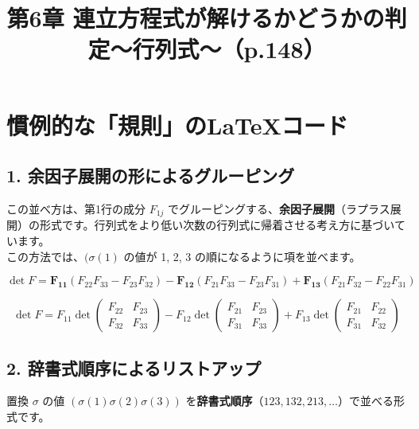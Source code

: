 \documentclass{ltjsarticle}
\begin{document}
\title{第6章 連立方程式が解けるかどうかの判定～行列式～（p.148）}
\maketitle %

\section*{慣例的な「規則」のLaTeXコード}

\subsection*{1. 余因子展開の形によるグルーピング}

この並べ方は、第1行の成分 $F_{1j}$ でグルーピングする、\textbf{余因子展開}（ラプラス展開）の形式です。行列式をより低い次数の行列式に帰着させる考え方に基づいています。 \\
この方法では、$(\sigma(1)$ の値が 1, 2, 3 の順になるように項を並べます。

$$
\det F = \mathbf{F_{11}}(F_{22}F_{33} - F_{23}F_{32}) - \mathbf{F_{12}}(F_{21}F_{33} - F_{23}F_{31}) + \mathbf{F_{13}}(F_{21}F_{32} - F_{22}F_{31})
$$


$$
\det F = F_{11}\det\begin{pmatrix} F_{22} & F_{23} \\ F_{32} & F_{33} \end{pmatrix} - F_{12}\det\begin{pmatrix} F_{21} & F_{23} \\ F_{31} & F_{33} \end{pmatrix} + F_{13}\det\begin{pmatrix} F_{21} & F_{22} \\ F_{31} & F_{32} \end{pmatrix}
$$

\subsection*{2. 辞書式順序によるリストアップ}

置換 $\sigma$ の値 $(\sigma(1)\sigma(2)\sigma(3))$ を\textbf{辞書式順序}（$123, 132, 213, \dots$）で並べる形式です。
\end{document}
